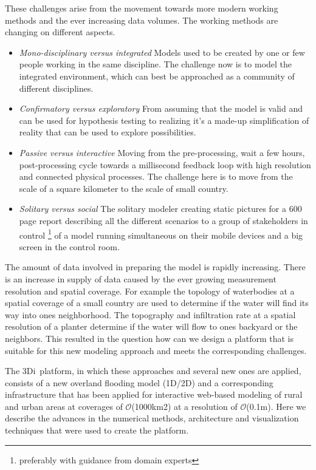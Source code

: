\documentclass[a4paper]{article}
\DeclareRobustCommand{\orderof}{\ensuremath{\mathcal{O}}}
\DeclareRobustCommand{\threedi}{3Di~}
\begin{document}
These challenges arise from the movement towards more modern working methods and the ever increasing data volumes. The working methods are changing on different aspects.
\begin{itemize}
\item \emph{Mono-disciplinary versus integrated} Models used to be created by one or few people working in the same discipline. The challenge now is to model the integrated environment, which can best be approached as a community \citep{Voinov2010} of different disciplines.
\item \emph{Confirmatory versus exploratory} From assuming that the model is valid and can be used for hypothesis testing to realizing it's a made-up simplification of reality \citep{Oreskes1994} that can be used to explore possibilities.
\item \emph{Passive versus interactive} Moving from the pre-processing, wait a few hours, post-processing cycle towards a millisecond feedback loop with high resolution and connected physical processes. The challenge here is to move from the scale of a square kilometer \citep[for example][]{Losasso2008} to the scale of small country.
\item \emph{Solitary versus social} The solitary modeler creating static pictures for a 600 page report describing all the different scenarios to a group of stakeholders in control \footnote{preferably with guidance from domain experts} of a model running simultaneous on their mobile devices and a big screen in the control room.
\end{itemize}

The amount of data involved in preparing the model is rapidly increasing. There is an increase in supply of data caused by the ever growing measurement resolution and spatial coverage. For example the topology of waterbodies at a spatial coverage of a small country are used to determine if the water will find its way into ones neighborhood. The topography and infiltration rate at a spatial resolution of a planter determine if the water will flow to ones backyard or the neighbors.
This resulted in the question how can we design a platform that is suitable for this new modeling approach and meets the corresponding challenges.

The \threedi  platform, in which these approaches and several new ones are applied, consists of a new overland flooding model (1D/2D) and a corresponding infrastructure that has been applied for interactive web-based modeling of rural and urban areas at coverages of \orderof(1000km2) at a resolution of \orderof(0.1m). Here we describe the advances in the numerical methods, architecture and visualization techniques that were used to create the platform.
\end{document}
